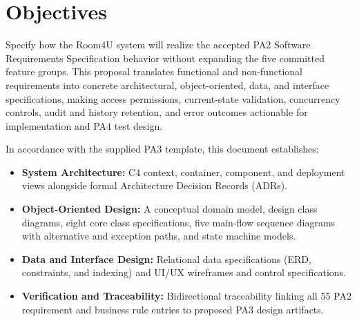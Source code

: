 \section{Objectives}
Specify how the Room4U system will realize the accepted PA2 Software Requirements Specification behavior without expanding the five committed feature groups. This proposal translates functional and non-functional requirements into concrete architectural, object-oriented, data, and interface specifications, making access permissions, current-state validation, concurrency controls, audit and history retention, and error outcomes actionable for implementation and PA4 test design.

In accordance with the supplied PA3 template, this document establishes:
\begin{itemize}[leftmargin=1.5em,itemsep=2pt,topsep=2pt]
  \item \textbf{System Architecture:} C4 context, container, component, and deployment views alongside formal Architecture Decision Records (ADRs).
  \item \textbf{Object-Oriented Design:} A conceptual domain model, design class diagrams, eight core class specifications, five main-flow sequence diagrams with alternative and exception paths, and state machine models.
  \item \textbf{Data and Interface Design:} Relational data specifications (ERD, constraints, and indexing) and UI/UX wireframes and control specifications.
  \item \textbf{Verification and Traceability:} Bidirectional traceability linking all 55 PA2 requirement and business rule entries to proposed PA3 design artifacts.
\end{itemize}

\clearpage